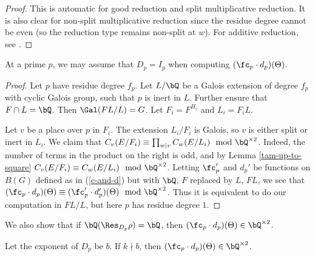 \begin{proof}
This is automatic for good reduction and split multiplicative reduction. It is also clear for non-split multiplicative reduction since the residue degree cannot be even (so the reduction type remains non-split at $w$). For additive reduction, see \cite[Lemma 3.12]{reg-const}.
\end{proof}

\begin{lemma}\label{DeqI}
    At a prime $p$, we may assume that $D_p = I_p$ when computing $(\fc_p \cdot d_p)(\Theta)$. 
\end{lemma}

\begin{proof}
Let $p$ have residue degree $f_p$. Let $L / \bQ$ be a Galois extension of degree $f_p$ with cyclic Galois group, such that $p$ is inert in $L$. Further ensure that $F \cap L = \bQ$. Then $\Gal(FL / L) = G$. Let $F_i = F^{H_i}$ and $L_i = F_i L$.

Let $v$ be a place over $p$ in $F_i$. The extension $L_i / F_i$ is Galois, so $v$ is either split or inert in $L_i$.
We claim that $C_v(E / F_i) \equiv \prod_{w | v} C_w(E / L_i) \mod \bQ^{\times 2}$. Indeed, the number of terms in the product on the right is odd, and by Lemma \ref{tam-up-to-square} $C_v(E / F_i) \equiv C_w(E / L_i) \mod \bQ^{\times 2}$. 
Letting $\fc_p'$ and $d_p'$ be functions on $B(G)$ defined as in (\ref{c-and-d}) but with $\bQ$, $F$ replaced by $L$, $FL$, we see that $(\fc_p \cdot d_p)(\Theta) \equiv (\fc_p' \cdot d_p')(\Theta) \mod \bQ^{\times 2}$. 
Thus it is equivalent to do our computation in $FL / L$, but here $p$ has residue degree $1$.
\end{proof}

We also show that if $\bQ(\Res_{D_p} \rho) = \bQ$, then $(\fc_p \cdot d_p)(\Theta) \in \bQ^{\times 2}$.

\begin{lemma}\label{rational-res}
    Let the exponent of $D_p$ be $b$. If $k \nmid b$, then $(\fc_p \cdot d_p)(\Theta) \in \bQ^{\times 2}$. 
\end{lemma}

